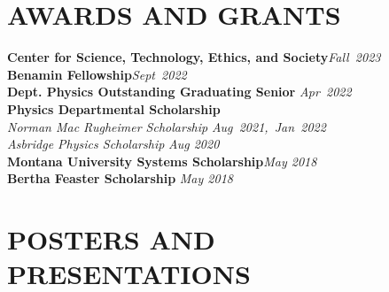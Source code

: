 \documentclass[margin]{res}
\begin{document}
\begin{resume}
\section{\uppercase{Awards and Grants}}
\textbf{Center for Science, Technology, Ethics, and Society}\hfill {\sl Fall~2023}\vspace*{1ex}\\
\textbf{Benamin Fellowship}\hfill {\sl Sept~2022}\vspace*{1ex}\\
\textbf{Dept. Physics Outstanding Graduating Senior} \hfill {\sl Apr~2022}\vspace*{1ex}\\
\textbf{Physics Departmental Scholarship}\\
\hspace{2ex} {\sl Norman Mac Rugheimer Scholarship} \hfill {\sl Aug~2021,~Jan~2022}\\
\hspace{2ex} {\sl Asbridge Physics Scholarship} \hfill {\sl Aug 2020}\vspace*{1ex}\\
\textbf{Montana University Systems Scholarship}\hfill\hfil {\sl May 2018}\vspace*{1ex}\\
\textbf{Bertha Feaster Scholarship} \hfill {\sl May 2018}

\section{\uppercase{Posters and Presentations}}


\end{resume}
\end{document}
